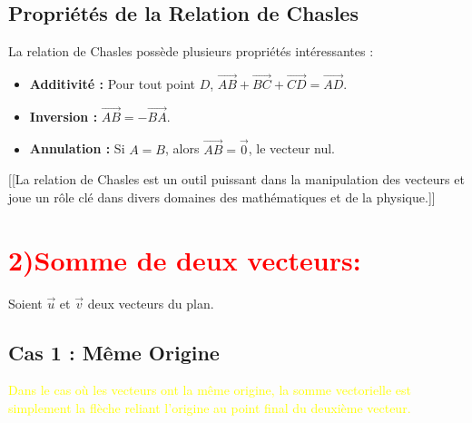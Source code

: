 \documentclass[12pt]{article}
\begin{document}
\subsection*{Propriétés de la Relation de Chasles}

La relation de Chasles possède plusieurs propriétés intéressantes :

\begin{itemize}
  \item \textbf{Additivité :} Pour tout point \(D\), \(\vec{AB} + \vec{BC} + \vec{CD} = \vec{AD}\).
  \item \textbf{Inversion :} \(\vec{AB} = -\vec{BA}\).
  \item \textbf{Annulation :} Si \(A = B\), alors \(\vec{AB} = \vec{0}\), le vecteur nul.
\end{itemize}

[[La relation de Chasles est un outil puissant dans la manipulation des vecteurs et joue un rôle clé dans divers domaines des mathématiques et de la physique.]]
\section*{\textcolor{red}{\textbf{2)Somme de deux vecteurs:}}}
Soient $\vec{u}$ et $\vec{v}$ deux vecteurs du plan.
\subsection*{Cas 1 : Même Origine}

\textcolor{yellow}{Dans le cas où les vecteurs ont la même origine, la somme vectorielle est simplement la flèche reliant l'origine au point final du deuxième vecteur.}
\begin{center}
\end{center}

\begin{center}
\end{center}
\end{document}
